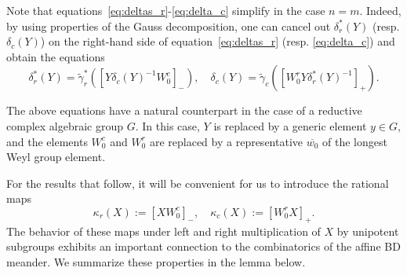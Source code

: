 \documentclass[11pt]{article}
\theoremstyle{definition}\newtheorem{definition}[theorem]{Definition}
\theoremstyle{definition}\newtheorem{remark}[theorem]{Remark}
\theoremstyle{remark}
\numberwithin{equation}{section}
\begin{document}
Note that equations~\eqref{eq:deltas_r}-\eqref{eq:delta_c} simplify in the case $n = m$. Indeed, by using properties of the Gauss decomposition, one can cancel out $\delta_r^*(Y)$ (resp. $\delta_c(Y)$) on the right-hand side of equation~\eqref{eq:deltas_r} (resp. \eqref{eq:delta_c}) and obtain the equations
\begin{equation*}
    \delta_r^*(Y) = \tilde{\gamma}_r^*([Y\delta_c(Y)^{-1}W_0^c]_-), \quad \delta_c(Y) = \tilde{\gamma}_c([W_0^rY\delta_r^*(Y)^{-1}]_+).
\end{equation*}

The above equations have a natural counterpart in the case of a reductive complex algebraic group $G$. In this case, $Y$ is replaced by a generic element $y \in G$, and the elements $W_0^c$ and $W_0^r$ are replaced by a representative $\overline{w_0}$ of the longest Weyl group element.

For the results that follow, it will be convenient for us to introduce the rational maps
\begin{equation}\label{eq:kappas}
    \kappa_r(X) := [XW_0^c]_-, \quad \kappa_c(X) := [W_0^r X]_+.
\end{equation}
The behavior of these maps under left and right multiplication of $X$ by unipotent subgroups exhibits an important connection to the combinatorics of the affine BD meander. We summarize these properties in the lemma below.
\end{document}
